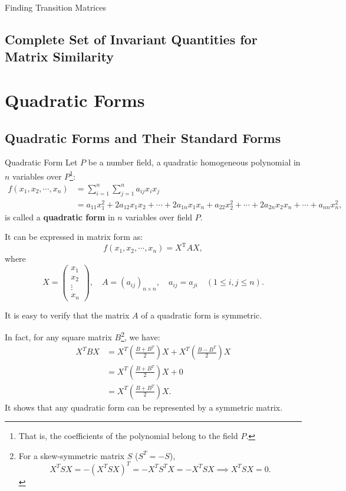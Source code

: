 \documentclass[11pt]{../../TexTemplate/elegantbook} %
\begin{document}
\begin{leftbarTitle}{Finding Transition Matrices}\end{leftbarTitle}

\section{Complete Set of Invariant Quantities for Matrix Similarity}



\chapter{Quadratic Forms}
\section{Quadratic Forms and Their Standard Forms}
\begin{definition}{Quadratic Form}
    Let \(P\) be a number field, a quadratic homogeneous polynomial in \( n \) variables over \( P \)\footnote{
        That is, the coefficients of the polynomial belong to the field \( P \).
    }:
    \begin{align*}
        f( x_{1}, x_{2}, \cdots, x_{n}) &= \sum_{i=1}^{n} \sum_{j=1}^{n} a_{ij} x_{i} x_{j} \\
    &= a_{11}x_{1}^{2} + 2a_{12}x_{1}x_{2} + \cdots + 2a_{1n}x_{1}x_{n} + a_{22}x_{2}^{2} + \cdots + 2a_{2n}x_{2}x_{n} + \cdots + a_{nn}x_{n}^{2},
    \end{align*}
    is called a \textbf{quadratic form} in \( n \) variables over field \( P \).

    It can be expressed in matrix form as:
    \[
    f( x_{1}, x_{2}, \cdots, x_{n}) = X^{\mathrm{T}} A X,
    \]
    where 
    \[
    X = \begin{pmatrix}
        x_{1} \\
        x_{2} \\
        \vdots \\
        x_{n}
    \end{pmatrix}, \quad
    A = (a_{ij})_{n \times n}, \quad a_{ij} = a_{ji} \quad (1 \leqslant i, j \leqslant n).
    \]
\end{definition}
It is easy to verify that the matrix \( A \) of a quadratic form is symmetric.
\begin{note}
    In fact, for any square matrix \( B \)\footnote{
        For a skew-symmetric matrix \( S \) (\( S^{T} = -S \)),
        \[
        X^{T} S X = - (X^{T} S X)^{T} = - X^{T} S^{T} X = - X^{T} S X \implies X^{T} S X = 0.
        \]
    }, we have:
    \begin{align*}
        X^{T}BX &= X^{T}\left( \frac{B + B^{T}}{2} \right)X + X^{T}\left( \frac{B - B^{T}}{2} \right)X \\
        &= X^{T}\left( \frac{B + B^{T}}{2} \right)X + 0 \\
        &= X^{T}\left( \frac{B + B^{T}}{2} \right)X.
    \end{align*}
    It shows that any quadratic form can be represented by a symmetric matrix.
\end{note}
\end{document}
